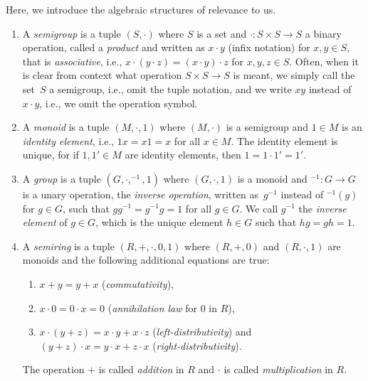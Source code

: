 
Here, we introduce the algebraic structures of relevance to us.

\begin{enumerate} 

\item A \emph{semigroup} 
is a tuple $(S, \cdot)$ where $S$ is a set and $\cdot \colon S \times S \to S$
a binary operation, called a \emph{product} and
written as $x\cdot y$ (infix notation) %
for $x,y \in S$, that is \emph{associative}, i.e.,
$x \cdot ( y \cdot z ) = (x \cdot y)\cdot z$ for $x,y,z \in S$.
Often, %
when it is clear from context what operation $S \times S \to S$ is meant, 
we simply call the set~$S$ a semigroup, i.e., omit the tuple notation,
and we write $xy$ instead of~$x \cdot y$, i.e., we
omit the operation symbol.
	
\item A \emph{monoid} 
 is a tuple $(M, \cdot, 1)$ where $(M, \cdot)$ is a semigroup and $1 \in M$ is 
 an \emph{identity element}, i.e., $1x = x1 = x$ for all $x \in M$.
 The identity element is unique,
 for if $1,1' \in M$ are identity elements, then $1 = 1 \cdot 1' = 1'$.
   
\item A \emph{group}  
 is a tuple $(G, \cdot, ^{-1}, 1)$ where $(G, \cdot, 1)$ is a monoid
 and $^{-1} \colon G \to G$ is a unary operation, the \emph{inverse operation},
  written as~$g^{-1}$ instead of $^{-1}(g)$ for $g \in G$,
 such that $gg^{-1} = g^{-1}g = 1$
 for all $g \in G$.
 We call $g^{-1}$ the \emph{inverse element} of $g \in G$, which
 is the unique element $h \in G$
 such that $hg = gh = 1$. 

\item A \emph{semiring} 
 is a tuple $(R, +, \cdot, 0, 1)$
 where $(R, +, 0)$ and $(R, \cdot, 1)$ are monoids
 and the following additional equations are true:
 
 \begin{enumerate} 
 \item $x + y = y + x$ (\emph{commutativity}), 
 
 \item $x \cdot 0 = 0\cdot x = 0$ (\emph{annihilation law} for $0$ in $R$), 
  
 \item $x \cdot (y+z) = x\cdot y + x \cdot z$ (\emph{left-distributivity}) and \\ 
   $(y+z) \cdot x = y\cdot x + z\cdot x$ (\emph{right-distributivity}).  
 \end{enumerate}
 The operation $+$ is called \emph{addition} in $R$
 and $\cdot$ is called \emph{multiplication} in $R$.
\end{enumerate}

